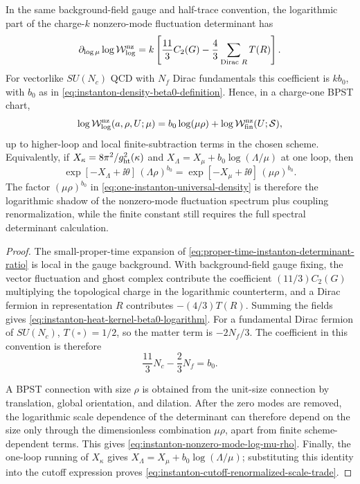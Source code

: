 \begin{proposition}
\label{prop:instanton-heat-kernel-beta0-logarithm}
In the same background-field gauge and half-trace convention, the logarithmic
part of the charge-\(k\) nonzero-mode fluctuation determinant has
\begin{equation}
  \partial_{\log\mu}\log\mathcal W_{\rm log}^{\rm nz}
  =
  k\left[
    \frac{11}{3}C_2(G)
    -\frac{4}{3}\sum_{\text{\rm Dirac }R}T(R)
  \right].
  \label{eq:instanton-heat-kernel-beta0-logarithm}
\end{equation}
For vectorlike \(SU(N_c)\) QCD with \(N_f\) Dirac fundamentals this coefficient
is \(k b_0\), with \(b_0\) as in
\eqref{eq:instanton-density-beta0-definition}.  Hence, in a charge-one BPST
chart,
\begin{equation}
  \log\mathcal W_{\rm log}^{\rm nz}(a,\rho,U;\mu)
  =
  b_0\log(\mu\rho)+\log\mathcal W_{\rm fin}^{\rm nz}(U;\mathcal S),
  \label{eq:instanton-nonzero-mode-log-mu-rho}
\end{equation}
up to higher-loop and local finite-subtraction terms in the chosen scheme.
Equivalently, if \(X_\kappa=8\pi^2/g_{\rm ht}^2(\kappa)\) and
\(X_\Lambda=X_\mu+b_0\log(\Lambda/\mu)\) at one loop, then
\begin{equation}
  \exp[-X_\Lambda+\ii\theta]\,
  (\Lambda\rho)^{b_0}
  =
  \exp[-X_\mu+\ii\theta]\,
  (\mu\rho)^{b_0}.
  \label{eq:instanton-cutoff-renormalized-scale-trade}
\end{equation}
The factor \((\mu\rho)^{b_0}\) in
\eqref{eq:one-instanton-universal-density} is therefore the logarithmic
shadow of the nonzero-mode fluctuation spectrum plus coupling
renormalization, while the finite constant still requires the full spectral
determinant calculation.
\end{proposition}

\begin{proof}
The small-proper-time expansion of
\eqref{eq:proper-time-instanton-determinant-ratio} is local in the gauge
background.  With background-field gauge fixing, the vector fluctuation and
ghost complex contribute the coefficient \((11/3)C_2(G)\) multiplying the
topological charge in the logarithmic counterterm, and a Dirac fermion in
representation \(R\) contributes \(-(4/3)T(R)\).  Summing the fields gives
\eqref{eq:instanton-heat-kernel-beta0-logarithm}.  For a fundamental Dirac
fermion of \(SU(N_c)\), \(T(\square)=1/2\), so the matter term is
\(-2N_f/3\).  The coefficient in this convention is therefore
\[
  \frac{11}{3}N_c-\frac{2}{3}N_f=b_0 .
\]

A BPST connection with size \(\rho\) is obtained from the unit-size connection
by translation, global orientation, and dilation.  After the zero modes are
removed, the logarithmic scale dependence of the determinant can therefore
depend on the size only through the dimensionless combination \(\mu\rho\),
apart from finite scheme-dependent terms.  This gives
\eqref{eq:instanton-nonzero-mode-log-mu-rho}.  Finally, the one-loop running of
\(X_\kappa\) gives \(X_\Lambda=X_\mu+b_0\log(\Lambda/\mu)\); substituting this
identity into the cutoff expression proves
\eqref{eq:instanton-cutoff-renormalized-scale-trade}.
\end{proof}

